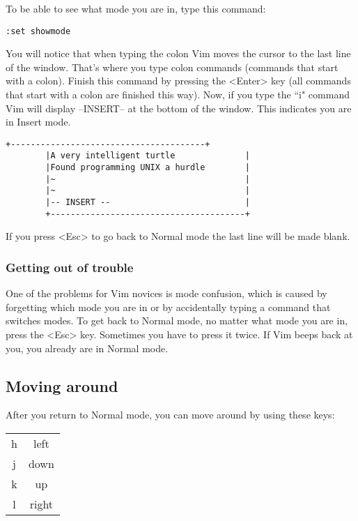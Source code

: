 To be able to see what mode you are in, type this command:

 \begin{Verbatim}[samepage=true]
 :set showmode
 \end{Verbatim}

You will notice that when typing the colon Vim moves the cursor to the last line of the window.
That's where you type colon commands (commands that start with a colon).
Finish this command by pressing the <Enter> key (all commands that start with a colon are finished this way).
Now, if you type the ``i" command Vim will display --INSERT-- at the bottom of the window.
This indicates you are in Insert mode.

		\begin{Verbatim}[samepage=true]
		+---------------------------------------+
		|A very intelligent turtle              |
		|Found programming UNIX a hurdle        |
		|~                                      |
		|~                                      |
		|-- INSERT --                           |
		+---------------------------------------+
		\end{Verbatim}

If you press <Esc> to go back to Normal mode the last line will be made blank.

\subsubsection{Getting out of trouble}

One of the problems for Vim novices is mode confusion, which is caused by forgetting which mode you are in or by accidentally typing a command that switches modes.
To get back to Normal mode, no matter what mode you are in, press the <Esc> key.
Sometimes you have to press it twice.
If Vim beeps back at you, you already are in Normal mode.

\subsection{Moving around}

After you return to Normal mode, you can move around by using these keys:
\label{hjlk}
\begin{center}
				\begin{tabular}{c|c}
								h & left\\
								j & down\\
								k & up\\
								l & right
				\end{tabular}
\end{center}


